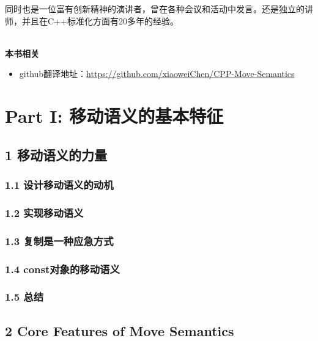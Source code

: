 \documentclass[11pt,a4paper,UTF8]{ctexart}
\begin{document}
	同时也是一位富有创新精神的演讲者，曾在各种会议和活动中发言。还是独立的讲师，并且在C++标准化方面有20多年的经验。\par
	
	\hspace*{\fill} \\ %
	\noindent\textbf{本书相关}\ \par
	\begin{itemize}
		\item github翻译地址：\href{https://github.com/xiaoweiChen/CPP-Move-Semantics}{https://github.com/xiaoweiChen/CPP-Move-Semantics}
	\end{itemize}
	\newpage
	
	\tableofcontents
	\newpage
	
	\pagestyle{empty}
	
	

	\section{Part I: 移动语义的基本特征}
	
	\subsection{1 移动语义的力量}
	
		\subsubsection{1.1 设计移动语义的动机}
		
		\subsubsection{1.2 实现移动语义}
		
		\subsubsection{1.3 复制是一种应急方式}
		
		\subsubsection{1.4 const对象的移动语义}
		
		\subsubsection{1.5 总结}
		
	\subsection{2 Core Features of Move Semantics}
	
\end{document}
